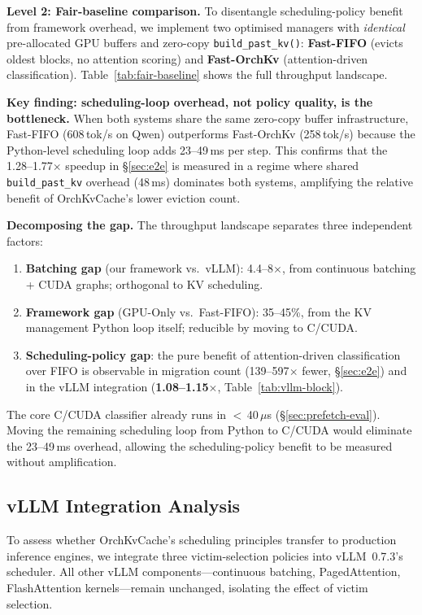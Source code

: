 \documentclass[conference]{IEEEtran}
\begin{document}
\textbf{Level 2: Fair-baseline comparison.} To disentangle scheduling-policy benefit from framework overhead, we implement two optimised managers with \emph{identical} pre-allocated GPU buffers and zero-copy \texttt{build\_past\_kv()}: \textbf{Fast-FIFO} (evicts oldest blocks, no attention scoring) and \textbf{Fast-OrchKv} (attention-driven classification). Table~\ref{tab:fair-baseline} shows the full throughput landscape.

\textbf{Key finding: scheduling-loop overhead, not policy quality, is the bottleneck.}
When both systems share the same zero-copy buffer infrastructure, Fast-FIFO (608\,tok/s on Qwen) outperforms Fast-OrchKv (258\,tok/s) because the Python-level scheduling loop adds 23--49\,ms per step. This confirms that the 1.28--1.77$\times$ speedup in \S\ref{sec:e2e} is measured in a regime where shared \texttt{build\_past\_kv} overhead (48\,ms) dominates both systems, amplifying the relative benefit of OrchKvCache's lower eviction count.

\textbf{Decomposing the gap.} The throughput landscape separates three independent factors:
\begin{enumerate}
\item \textbf{Batching gap} (our framework vs.\ vLLM): 4.4--8$\times$, from continuous batching + CUDA graphs; orthogonal to KV scheduling.
\item \textbf{Framework gap} (GPU-Only vs.\ Fast-FIFO): 35--45\%, from the KV management Python loop itself; reducible by moving to C/CUDA.
\item \textbf{Scheduling-policy gap}: the pure benefit of attention-driven classification over FIFO is observable in migration count (139--597$\times$ fewer, \S\ref{sec:e2e}) and in the vLLM integration (\textbf{1.08--1.15$\times$}, Table~\ref{tab:vllm-block}).
\end{enumerate}

The core C/CUDA classifier already runs in $<$\,40\,$\mu$s (\S\ref{sec:prefetch-eval}). Moving the remaining scheduling loop from Python to C/CUDA would eliminate the 23--49\,ms overhead, allowing the scheduling-policy benefit to be measured without amplification.

\subsection{vLLM Integration Analysis}
\label{sec:vllm-integration}

To assess whether OrchKvCache's scheduling principles transfer to production inference engines, we integrate three victim-selection policies into vLLM~0.7.3's scheduler. All other vLLM components---continuous batching, PagedAttention, FlashAttention kernels---remain unchanged, isolating the effect of victim selection.
\end{document}
